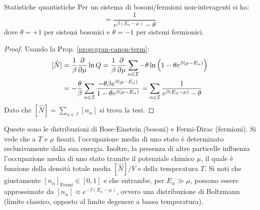 \begin{theorem}{Statistiche quantistiche}{}
	Per un sistema di bosoni/fermioni non-interagenti si ha:
	\begin{equation}
		[n_\alpha] = \frac{1}{e^{\beta (E_\alpha - \mu)} - \theta}
		\label{eq:fer-dir-bos-ein}
	\end{equation}
	dove $ \theta = +1 $ per sistemi bosonici e $ \theta = -1 $ per sistemi fermionici.

	\tcblower

	\begin{proof}
		Usando la Prop. \ref{prop:gran-canon-term}:
		\begin{equation*}
			\begin{split}
				[\hat{N}]
				& = \frac{1}{\beta} \frac{\partial}{\partial \mu} \ln Q = \frac{1}{\beta} \frac{\partial}{\partial \mu} \sum_{\alpha \in \mathcal{I}} -\theta \ln \left( 1 - \theta e^{\beta (\mu - E_\alpha)} \right) \\
				& = - \frac{\theta}{\beta} \sum_{\alpha \in \mathcal{I}} \frac{-\theta \beta e^{\beta (\mu - E_\alpha)}}{1 - \theta e^{\beta (\mu - E_\alpha)}} = \sum_{\alpha \in \mathcal{I}} \frac{1}{e^{\beta (E_\alpha - \mu)} - \theta}
			\end{split}
		\end{equation*}
		Dato che $ [\hat{N}] = \sum_{\alpha \in \mathcal{I}} [n_\alpha] $ si trova la tesi.
	\end{proof}
\end{theorem}

Queste sono le distribuzioni di Bose-Einstein (bosoni) e Fermi-Dirac (fermioni). Si vede che a $ T $ e $ \mu $ fissati, l'occupazione media di uno stato è determinato esclusivamente dalla sua energia\footnotemark. Inoltre, la presenza di altre particelle influenza l'occupazione media di uno stato tramite il potenziale chimico $ \mu $, il quale è funzione della densità totale media $ [\hat{N}]/V $ e della temperatura $ T $.
%
%
Si noti che giustamente $ [n_\alpha]_\text{Fermi} \in [0,1] $ e che entrambe, per $ E_\alpha \gg \mu $, possono essere approssimate da $ [n_\alpha] \approx e^{-\beta (E_\alpha - \mu)} $, ovvero una distribuzione di Boltzmann (limite classico\footnotemark, opposto al limite degenere a bassa temperatura).


